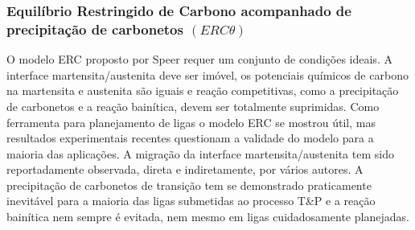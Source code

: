 


\subsubsection{Equilíbrio Restringido de Carbono acompanhado de precipitação de carbonetos $(ERC\theta)$}


O modelo ERC proposto por Speer requer um conjunto de condições ideais. A interface martensita/austenita deve ser imóvel, os potenciais químicos de carbono na martensita e austenita são iguais e reação competitivas, como a precipitação de carbonetos e a reação bainítica, devem ser totalmente suprimidas. Como ferramenta para planejamento de ligas o modelo ERC se mostrou útil, mas resultados experimentais recentes questionam a validade do modelo para a maioria das aplicações. A migração da interface martensita/austenita tem sido reportadamente observada, direta e indiretamente, por vários autores. A precipitação de carbonetos de transição tem se demonstrado praticamente inevitável para a maioria das ligas submetidas ao processo T\&P e a reação bainítica nem sempre é evitada, nem mesmo em ligas cuidadosamente planejadas. 

